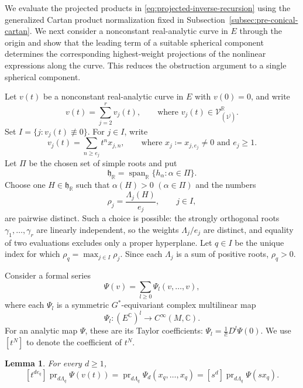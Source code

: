 \documentclass[11pt,reqno]{amsart}
\newtheorem{lemma}[theorem]{Lemma}
\theoremstyle{corollary}
\theoremstyle{conjecture}
\theoremstyle{assumption}
\theoremstyle{proposition}
\theoremstyle{remark}
\numberwithin{equation}{section}
\begin{document}
We evaluate the projected products in \eqref{eq:projected-inverse-recursion} using the generalized Cartan product normalization fixed in Subsection~\ref{subsec:pre-conical-cartan}. We next consider a nonconstant real-analytic curve in $E$ through the origin and show that the leading term of a suitable spherical component determines the corresponding highest-weight projections of the nonlinear expressions along the curve. This reduces the obstruction argument to a single spherical component.

Let $v(t)$ be a nonconstant real-analytic curve in $E$ with $v(0)=0$, and write
\[
v(t)=\sum_{j=2}^r v_j(t),\qquad \text{where }v_j(t)\in\mathcal V_{(1^j)}^{\mathbb R}.
\]
Set $I=\{j\colon v_j(t)\not\equiv 0\}$. For $j\in I$, write
\[
v_j(t)=\sum_{n\geq e_j}t^n x_{j,n},\qquad \text{where }x_j\coloneq x_{j,e_j}\neq 0 \text{ and } e_j\geq 1.
\]
Let $\Pi$ be the chosen set of simple roots and put
\[
\mathfrak h_{\mathbb R}=\operatorname{span}_{\mathbb R}\{h_\alpha\colon\alpha\in\Pi\}.
\]
Choose one $H\in\mathfrak h_{\mathbb R}$ such that $\alpha(H)>0$ $(\alpha\in\Pi)$ and the numbers
\[
\rho_j=\frac{\Lambda_j(H)}{e_j},\qquad j\in I,
\]
are pairwise distinct.
Such a choice is possible: the strongly orthogonal roots $\gamma_1,\ldots,\gamma_r$ are linearly independent, so the weights $\Lambda_j/e_j$ are distinct, and equality of two evaluations excludes only a proper hyperplane. Let $q\in I$ be the unique index for which $\rho_q=\max_{j\in I}\rho_j$. Since each $\Lambda_j$ is a sum of positive roots, $\rho_q>0$.

Consider a formal series
\[
\Psi(v)=\sum_{l\geq 0}\Psi_l(v,\ldots,v),
\]
where each $\Psi_l$ is a symmetric $G^*$-equivariant complex multilinear map
\[
\Psi_l\colon (E^{\mathbb C})^{l}\longrightarrow C^\infty(M,\mathbb C).
\]
For an analytic map $\Psi$, these are its Taylor coefficients: $\Psi_l=\frac1{l!}D^l\Psi(0)$. We use $[t^N]$ to denote the coefficient of $t^N$.

\begin{lemma}\label{lem:leading-highest-weight-coefficient}
For every $d\geq 1$,
\begin{equation}\label{eq:leading-highest-weight-coefficient}
[t^{de_q}]\operatorname{pr}_{d\Lambda_q}\Psi(v(t))=\operatorname{pr}_{d\Lambda_q}\Psi_d(x_q,\ldots,x_q)=[s^d]\operatorname{pr}_{d\Lambda_q}\Psi(sx_q).
\end{equation}
\end{lemma}
\end{document}
